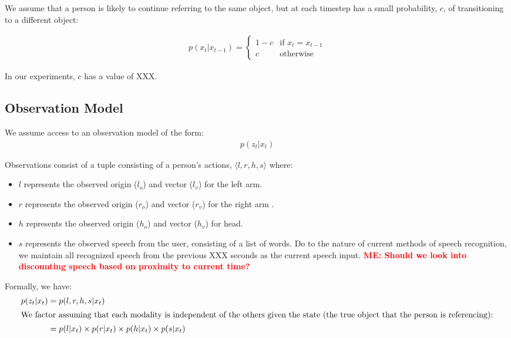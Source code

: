 \documentclass[letterpaper, 10 pt, conference]{ieeeconf}
\newcommand{\stnote}[1]{\textcolor{Blue}{\textbf{ST: #1}}}
\newcommand{\menote}[1]{\textcolor{Red}{\textbf{ME: #1}}}
\begin{document}
We assume that a person is likely to continue referring to the same
object, but at each timestep has a small probability, $c$, of
transitioning to a different object: 

\begin{align}
p(x_t | x_{t-1}) = \left\{  \begin{array}{ll}
1-c &\mbox{if } x_t = x_{t-1}\\
c &\mbox{otherwise}
\end{array}\right.
\end{align}

In our experiments, $c$ has a value of XXX.


\subsection{Observation Model}

We assume access to an observation model of the form:
\begin{align}
p(z_t | x_t)
\end{align}

Observations consist of a tuple consisting of a person's actions,
$\langle l, r, h, s\rangle $ where:
\begin{itemize}
	\item $l$ represents the observed origin ($l_o$) and vector ($l_v$) for the left arm.
	\item $r$ represents the observed origin  ($r_o$) and vector ($r_v$)  for the right arm .
	\item $h$ represents the observed origin  ($h_o$) and vector ($h_v$)  for head.
	\item $s$ represents the observed speech from the user, consisting of a list of words. Do to the nature of current methods of speech recognition, we maintain all recognized speech from the previous XXX seconds as the current speech input. \menote{Should we look into discounting speech based on proximity to current time?}
	\end{itemize}

Formally, we have:
\begin{align}
p(z_t | x_t) &= p(l, r, h, s | x_t)\\
\intertext{We factor assuming that each modality is independent of the others given the state (the true object that the person is referencing):}
&= p(l | x_t) \times p(r | x_t) \times p(h | x_t) \times p(s | x_t)
\end{align}
\end{document}
